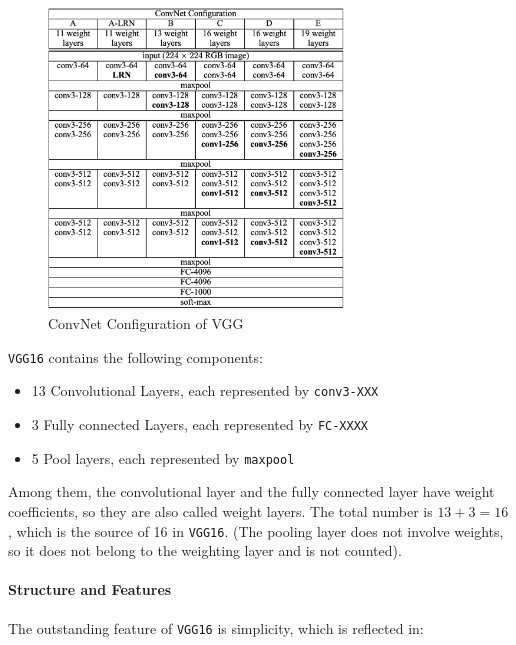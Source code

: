 \begin{figure}[h!]
\centering
\includegraphics[width=0.7\textwidth]{vgg.pdf}
\caption{ConvNet Configuration of VGG \cite{vgg16}}
\label{fig:vgg16config}
\end{figure}

\verb|VGG16| contains the following components:
\begin{itemize}
    \item 13 Convolutional Layers, each represented by \verb|conv3-XXX|
    \item 3 Fully connected Layers, each represented by \verb|FC-XXXX|
    \item 5 Pool layers, each represented by \verb|maxpool|
\end{itemize}

Among them, the convolutional layer and the fully connected layer have weight coefficients, so they are also called weight layers. The total number is $13+3=16$, which is the source of 16 in \verb|VGG16|. (The pooling layer does not involve weights, so it does not belong to the weighting layer and is not counted).

\paragraph{Structure and Features}
The outstanding feature of \verb|VGG16| is simplicity, which is reflected in:

